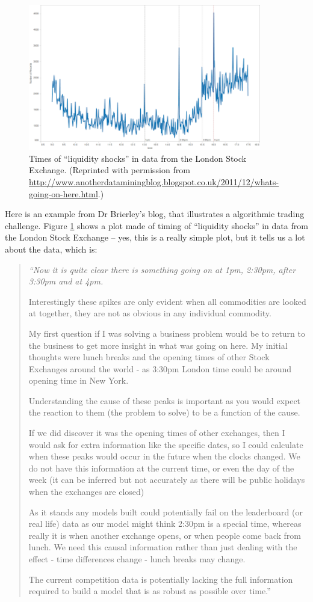 \documentclass{article}
\begin{document}
\begin{figure}[htp]
\centerline{\includegraphics[width=4in]{images/shockeventtimings.png}}
\caption{Times of ``liquidity shocks'' in data from the London Stock Exchange. (Reprinted with permission from \url{http://www.anotherdataminingblog.blogspot.co.uk/2011/12/whats-going-on-here.html}.)}
\label{liqshock}
\end{figure}

Here is an example from Dr Brierley's blog, that illustrates a algorithmic trading challenge. Figure \ref{liqshock} shows a plot made of timing of ``liquidity shocks'' in data from the London Stock Exchange -- yes, this is a really simple plot, but it tells us a lot about the data, which is:

\begin{quote}
{\em ``Now it is quite clear there is something going on at 1pm, 2:30pm, after 3:30pm and at 4pm.

Interestingly these spikes are only evident when all commodities are looked at together, they are not as obvious in any individual commodity.

My first question if I was solving a business problem would be to return to the business to get more insight in what was going on here. My initial thoughts were lunch breaks and the opening times of other Stock Exchanges around the world - as 3:30pm London time could be around opening time in New York.

Understanding the cause of these peaks is important as you would expect the reaction to them (the problem to solve) to be a function of the cause.

If we did discover it was the opening times of other exchanges, then I would ask for extra information like the specific dates, so I could calculate when these peaks would occur in the future when the clocks changed. We do not have this information at the current time, or even the day of the week (it can be inferred but not accurately as there will be public holidays when the exchanges are closed)

As it stands any models built could potentially fail on the leaderboard (or real life) data as our model might think 2:30pm is a special time, whereas really it is when another exchange opens, or when people come back from lunch. We need this causal information rather than just dealing with the effect - time differences change - lunch breaks may change.

The current competition data is potentially lacking the full information required to build a model that is as robust as possible over time.'' }
\end{quote}
\end{document}
